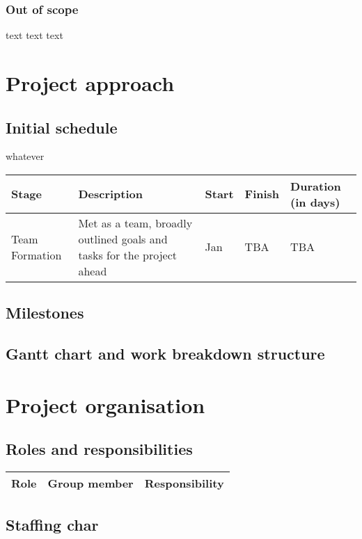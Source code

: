 \documentclass[a4paper, 12pt]{article}
\begin{document}
			\subsubsection{Out of scope}
				\par text text text

	\newpage
	\section{Project approach}
		\subsection{Initial schedule}
			\hfill whatever
			\begin{tabular}{ p{30 mm} p{51 mm} p{10 mm} p{10 mm} p{15 mm} }
				\toprule
				Stage & Description & Start & Finish & Duration (in days) \\
				\midrule
				Team Formation & Met as a team, broadly outlined goals and tasks for the project ahead & \nth{19} Jan & TBA & TBA \\ 
				\bottomrule
			\end{tabular}
		\subsection{Milestones}

		\subsection{Gantt chart and work breakdown structure}

	\newpage
	\section{Project organisation}
		\subsection{Roles and responsibilities}
			\begin{tabular}{p{30 mm} p{30 mm} p{30 mm}}
				\toprule
					Role & Group member & Responsibility \\
				\bottomrule
			\end{tabular}

		\subsection{Staffing char}

	\newpage
\end{document}
